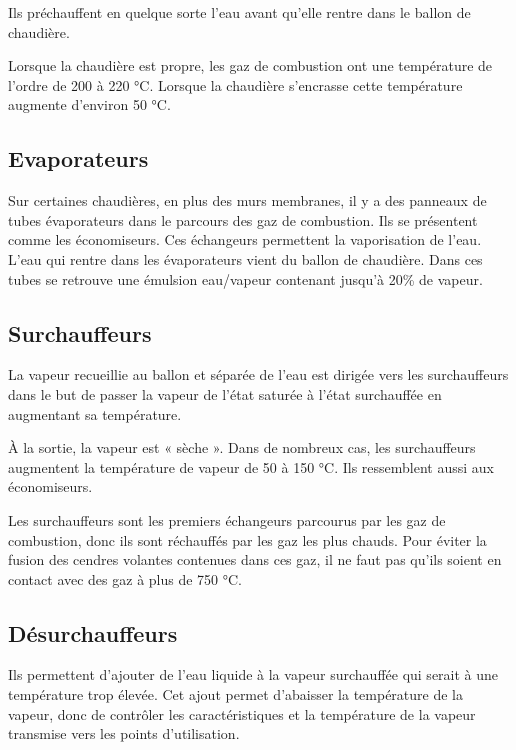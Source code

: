 Ils préchauffent en quelque sorte l’eau avant qu’elle rentre dans le ballon de chaudière.
\vspace{0.3cm}

Lorsque la chaudière est propre, les gaz de combustion ont une température de l’ordre de 200 à 220 °C. Lorsque la chaudière s’encrasse cette température augmente d’environ 50 °C.


\subsection{Evaporateurs}

Sur certaines chaudières, en plus des murs membranes, il y a des panneaux de tubes évaporateurs dans le parcours des gaz de combustion. Ils se présentent comme les économiseurs. Ces échangeurs permettent la vaporisation de l’eau. L’eau qui rentre dans les évaporateurs vient du ballon de chaudière.
Dans ces tubes se retrouve une émulsion eau/vapeur contenant jusqu’à 20\% de vapeur.


\subsection{Surchauffeurs}

La vapeur recueillie au ballon et séparée de l’eau est dirigée vers les surchauffeurs dans le but de passer la vapeur de l’état saturée à l’état surchauffée en augmentant sa température.
\vspace{0.3cm}

À la sortie, la vapeur est « sèche ». Dans de nombreux cas, les surchauffeurs augmentent la température de vapeur de 50 à 150 °C. Ils ressemblent aussi aux économiseurs.
\vspace{0.3cm}

Les surchauffeurs sont les premiers échangeurs parcourus par les gaz de combustion, donc ils sont réchauffés par les gaz les plus chauds. Pour éviter la fusion des cendres volantes contenues dans ces gaz, il ne faut pas qu’ils soient en contact avec des gaz à plus de 750 °C.


\subsection{Désurchauffeurs} 

Ils permettent d’ajouter de l’eau liquide à la vapeur surchauffée qui serait à une température trop élevée. Cet ajout permet d’abaisser la température de la vapeur, donc de contrôler les caractéristiques et la température de la vapeur transmise vers les points d’utilisation.

